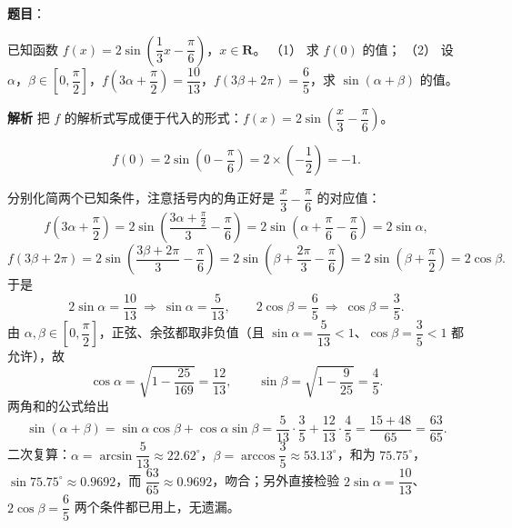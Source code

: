\begin{answer}

\textbf{题目}：

已知函数 $f(x)=2\sin\left(\dfrac13x-\dfrac{\pi}{6}\right)$，$x\in\mathbf R$。
（1） 求 $f(0)$ 的值；
（2） 设 $\alpha$，$\beta\in\left[0,\dfrac{\pi}{2}\right]$，$f\left(3\alpha+\dfrac{\pi}{2}\right)=\dfrac{10}{13}$，$f(3\beta+2\pi)=\dfrac65$，求 $\sin(\alpha+\beta)$ 的值。

\textbf{解析}
把 $f$ 的解析式写成便于代入的形式：$f(x)=2\sin\left(\dfrac x3-\dfrac{\pi}{6}\right)$。

\nopagebreak[4]
\[
f(0)=2\sin\left(0-\frac{\pi}{6}\right)=2\times\left(-\frac12\right)=-1.
\]

分别化简两个已知条件，注意括号内的角正好是 $\dfrac x3-\dfrac{\pi}{6}$ 的对应值：
\nopagebreak[4]
\[
f\left(3\alpha+\frac{\pi}{2}\right)=2\sin\left(\frac{3\alpha+\frac{\pi}{2}}{3}-\frac{\pi}{6}\right)
=2\sin\left(\alpha+\frac{\pi}{6}-\frac{\pi}{6}\right)=2\sin\alpha,
\]
\nopagebreak[4]
\[
f(3\beta+2\pi)=2\sin\left(\frac{3\beta+2\pi}{3}-\frac{\pi}{6}\right)
=2\sin\left(\beta+\frac{2\pi}{3}-\frac{\pi}{6}\right)=2\sin\left(\beta+\frac{\pi}{2}\right)=2\cos\beta.
\]
于是
\nopagebreak[4]
\[
2\sin\alpha=\frac{10}{13}\ \Longrightarrow\ \sin\alpha=\frac{5}{13},\qquad
2\cos\beta=\frac65\ \Longrightarrow\ \cos\beta=\frac35.
\]
由 $\alpha,\beta\in\left[0,\dfrac{\pi}{2}\right]$，正弦、余弦都取非负值（且 $\sin\alpha=\dfrac{5}{13}<1$、$\cos\beta=\dfrac35<1$ 都允许），故
\nopagebreak[4]
\[
\cos\alpha=\sqrt{1-\frac{25}{169}}=\frac{12}{13},\qquad
\sin\beta=\sqrt{1-\frac{9}{25}}=\frac45.
\]
两角和的公式给出
\nopagebreak[4]
\[
\sin(\alpha+\beta)=\sin\alpha\cos\beta+\cos\alpha\sin\beta
=\frac{5}{13}\cdot\frac35+\frac{12}{13}\cdot\frac45
=\frac{15+48}{65}=\frac{63}{65}.
\]
二次复算：$\alpha=\arcsin\dfrac{5}{13}\approx22.62^\circ$，$\beta=\arccos\dfrac35\approx53.13^\circ$，和为 $75.75^\circ$，$\sin75.75^\circ\approx0.9692$，而 $\dfrac{63}{65}\approx0.9692$，吻合；另外直接检验 $2\sin\alpha=\dfrac{10}{13}$、$2\cos\beta=\dfrac65$ 两个条件都已用上，无遗漏。



\end{answer}
